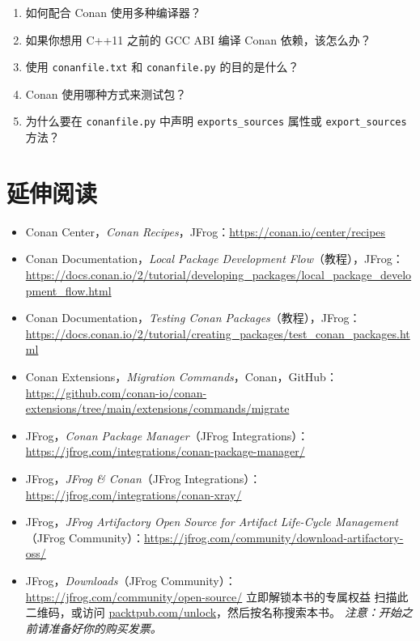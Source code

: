 \begin{enumerate}
\item 如何配合 Conan 使用多种编译器？
\item 如果你想用 C++11 之前的 GCC ABI 编译 Conan 依赖，该怎么办？
\item 使用 \texttt{conanfile.\allowbreak{}txt} 和 \texttt{conanfile.\allowbreak{}py} 的目的是什么？
\item Conan 使用哪种方式来测试包？
\item 为什么要在 \texttt{conanfile.\allowbreak{}py} 中声明 \texttt{exports\_\allowbreak{}sources} 属性或 \texttt{export\_\allowbreak{}sources} 方法？
\end{enumerate}

\section{延伸阅读}

\begin{itemize}
\item Conan Center，\emph{Conan Recipes}，JFrog：\href{https://conan.io/center/recipes}{https://conan.io/center/recipes}
\item Conan Documentation，\emph{Local Package Development Flow}（教程），JFrog：\href{https://docs.conan.io/2/tutorial/developing_packages/local_package_development_flow.html}{https://docs.conan.io/2/tutorial/developing\_packages/local\_package\_development\_flow.html}
\item Conan Documentation，\emph{Testing Conan Packages}（教程），JFrog：\href{https://docs.conan.io/2/tutorial/creating_packages/test_conan_packages.html}{https://docs.conan.io/2/tutorial/creating\_packages/test\_conan\_packages.html}
\item Conan Extensions，\emph{Migration Commands}，Conan，GitHub：\href{https://github.com/conan-io/conan-extensions/tree/main/extensions/commands/migrate}{https://github.com/conan-io/conan-extensions/tree/main/extensions/commands/migrate}
\item JFrog，\emph{Conan Package Manager}（JFrog Integrations）：\href{https://jfrog.com/integrations/conan-package-manager/}{https://jfrog.com/integrations/conan-package-manager/}
\item JFrog，\emph{JFrog \& Conan}（JFrog Integrations）：\href{https://jfrog.com/integrations/conan-xray/}{https://jfrog.com/integrations/conan-xray/}
\item JFrog，\emph{JFrog Artifactory Open Source for Artifact Life-Cycle Management}（JFrog Community）：\href{https://jfrog.com/community/download-artifactory-oss/}{https://jfrog.com/community/download-artifactory-oss/}
\item JFrog，\emph{Downloads}（JFrog Community）：\href{https://jfrog.com/community/open-source/}{https://jfrog.com/community/open-source/} 立即解锁本书的专属权益 扫描此二维码，或访问 \href{http://packtpub.com/unlock}{packtpub.com/unlock}，然后按名称搜索本书。 \emph{注意：开始之前请准备好你的购买发票。}
\end{itemize}

